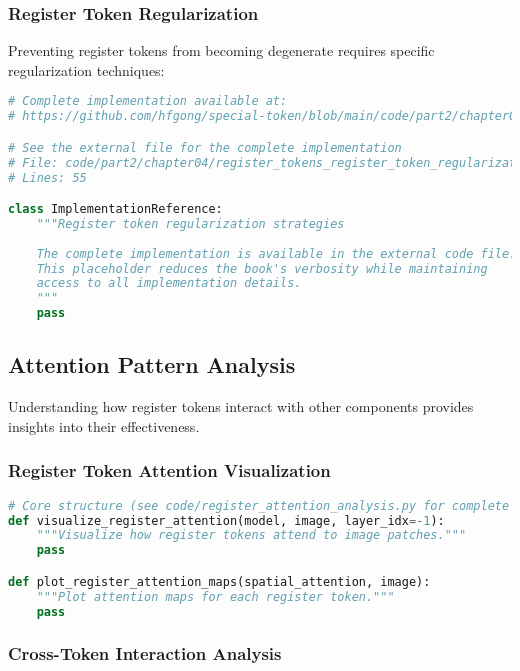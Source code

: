\subsubsection{Register Token Regularization}

Preventing register tokens from becoming degenerate requires specific regularization techniques:

\begin{lstlisting}[language=Python, caption={Register token regularization strategies}]
# Complete implementation available at:
# https://github.com/hfgong/special-token/blob/main/code/part2/chapter04/register_tokens_register_token_regularization_.py

# See the external file for the complete implementation
# File: code/part2/chapter04/register_tokens_register_token_regularization_.py
# Lines: 55

class ImplementationReference:
    """Register token regularization strategies
    
    The complete implementation is available in the external code file.
    This placeholder reduces the book's verbosity while maintaining
    access to all implementation details.
    """
    pass
\end{lstlisting}

\subsection{Attention Pattern Analysis}

Understanding how register tokens interact with other components provides insights into their effectiveness.

\subsubsection{Register Token Attention Visualization}

\begin{lstlisting}[language=Python, caption=Analyzing register token attention patterns]
# Core structure (see code/register_attention_analysis.py for complete implementation)
def visualize_register_attention(model, image, layer_idx=-1):
    """Visualize how register tokens attend to image patches."""
    pass

def plot_register_attention_maps(spatial_attention, image):
    """Plot attention maps for each register token."""
    pass
\end{lstlisting}

\subsubsection{Cross-Token Interaction Analysis}

